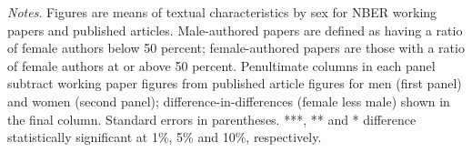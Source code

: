 \begin{table}
\begin{threeparttable}
\begin{tabular}{p{4cm}S@{}S@{}S[round-precision=3]S@{}S@{}S[round-precision=3]S[round-precision=3]}
            \bottomrule
        \end{tabular}
        \begin{tablenotes}
            \tiny
            \item \textit{Notes}. Figures are means of textual characteristics by sex for NBER working papers and published articles. Male-authored papers are defined as having a ratio of female authors below 50 percent; female-authored papers are those with a ratio of female authors at or above 50 percent. Penultimate columns in each panel subtract working paper figures from published article figures for men (first panel) and women (second panel); difference-in-differences (female less male) shown in the final column. Standard errors in parentheses. ***, ** and * difference statistically significant at 1\%, 5\% and 10\%, respectively.
        \end{tablenotes}
    \end{threeparttable}
\end{table}